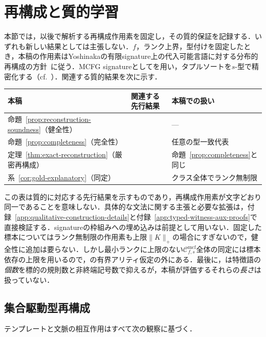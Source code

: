 \documentclass[11pt,a4paper]{ltjsarticle}
\numberwithin{equation}{section}
\theoremstyle{plain}
\theoremstyle{definition}
\theoremstyle{remark}
\newcommand{\Cmcf}[2]{\mathcal{C}^{\mathrm{mcf}}_{#1,#2}}
\begin{document}
\section{再構成と質的学習}
\label{sec:learner}

本節では，以後で解析する再構成作用素を固定し，その質的保証を記録する．いずれも新しい結果としては主張しない．$f$，ランク上界，型付けを固定したとき，本稿の作用素はYoshinakaの有限signature上の代入可能言語に対する分布的再構成の方針~\cite{Yoshinaka2015General}に従う．MCFG signatureとして\cite[Example~3]{Yoshinaka2015General}を用い，タプルソートを$s$-型で精密化する（cf.\ \cite[Section~8]{Yoshinaka2015General}）．関連する質的結果を次に示す．
\begin{center}
\footnotesize
\begin{tabular}{@{}lll@{}}
\hline
本稿 & 関連する先行結果 & 本稿での扱い\\
\hline
命題~\ref{prop:reconstruction-soundness}（健全性） & \cite[Lemma~2]{Yoshinaka2015General} & ---\\
命題~\ref{prop:completeness}（完全性） & \cite[Lemma~3]{Yoshinaka2015General} & 任意の型一致代表\\
定理~\ref{thm:exact-reconstruction}（厳密再構成） & \cite[Lemmas~2--3]{Yoshinaka2015General} & 命題~\ref{prop:completeness}と同じ\\
系~\ref{cor:gold-explanatory}（同定） & \cite[Theorem~1]{Yoshinaka2015General} & クラス全体でランク無制限\\
\hline
\end{tabular}
\end{center}
この表は質的に対応する先行結果を示すものであり，再構成作用素が文字どおり同一であることを意味しない．具体的な文法に関する主張と必要な拡張は，付録~\ref{app:qualitative-construction-details}と付録~\ref{app:typed-witness-aux-proofs}で直接検証する．signatureの枠組みへの埋め込みは前提として用いない．固定した標本についてはランク無制限の作用素も上限$\|K\|_+$の場合にすぎないので，健全性に追加は要らない．しかし最小ランクに上限のない$\Cmcf{f}{s}$全体の同定には標本依存の上限を用いるので，\cite{Yoshinaka2015General}の有界アリティ仮定の外にある．最後に，\cite{Yoshinaka2015General}は特徴語の\emph{個数}を標的の規則数と非終端記号数で抑えるが，本稿が評価するそれらの\emph{長さ}は扱っていない．

\subsection{集合駆動型再構成}

テンプレートと文脈の相互作用はすべて次の観察に基づく．
\end{document}

